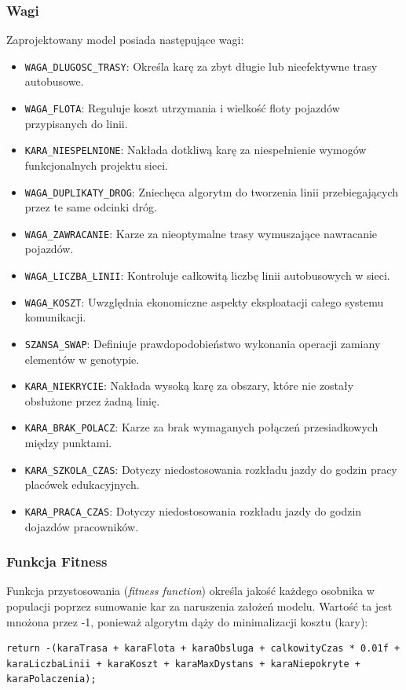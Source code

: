\subsubsection{Wagi}
Zaprojektowany model posiada następujące wagi:
\begin{itemize}
    \item \texttt{WAGA\_DLUGOSC\_TRASY}: Określa karę za zbyt długie lub nieefektywne trasy autobusowe.
    \item \texttt{WAGA\_FLOTA}: Reguluje koszt utrzymania i wielkość floty pojazdów przypisanych do linii.
    \item \texttt{KARA\_NIESPELNIONE}: Nakłada dotkliwą karę za niespełnienie wymogów funkcjonalnych projektu sieci.
    \item \texttt{WAGA\_DUPLIKATY\_DROG}: Zniechęca algorytm do tworzenia linii przebiegających przez te same odcinki dróg.
    \item \texttt{WAGA\_ZAWRACANIE}: Karze za nieoptymalne trasy wymuszające nawracanie pojazdów.
    \item \texttt{WAGA\_LICZBA\_LINII}: Kontroluje całkowitą liczbę linii autobusowych w sieci.
    \item \texttt{WAGA\_KOSZT}: Uwzględnia ekonomiczne aspekty eksploatacji całego systemu komunikacji.
    \item \texttt{SZANSA\_SWAP}: Definiuje prawdopodobieństwo wykonania operacji zamiany elementów w genotypie.
    \item \texttt{KARA\_NIEKRYCIE}: Nakłada wysoką karę za obszary, które nie zostały obsłużone przez żadną linię.
    \item \texttt{KARA\_BRAK\_POLACZ}: Karze za brak wymaganych połączeń przesiadkowych między punktami.
    \item \texttt{KARA\_SZKOLA\_CZAS}: Dotyczy niedostosowania rozkładu jazdy do godzin pracy placówek edukacyjnych.
    \item \texttt{KARA\_PRACA\_CZAS}: Dotyczy niedostosowania rozkładu jazdy do godzin dojazdów pracowników.
\end{itemize}
\subsubsection{Funkcja Fitness}
Funkcja przystosowania (\textit{fitness function}) określa jakość każdego osobnika w populacji poprzez sumowanie kar za naruszenia założeń modelu. Wartość ta jest mnożona przez -1, ponieważ algorytm dąży do minimalizacji kosztu (kary):
\begin{lstlisting}
return -(karaTrasa + karaFlota + karaObsluga + calkowityCzas * 0.01f + karaLiczbaLinii + karaKoszt + karaMaxDystans + karaNiepokryte + karaPolaczenia);
\end{lstlisting}
